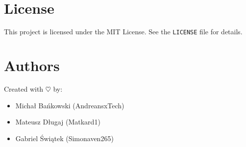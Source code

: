 \documentclass[11pt,a4paper]{article}
\begin{document}
\section{License}
This project is licensed under the MIT License. See the \texttt{LICENSE} file for details.

\section{Authors}
Created with \textcolor{staszicblue}{$\heartsuit$} by:
\begin{itemize}[leftmargin=*]
    \item Michał Bańkowski (AndreansxTech)
    \item Mateusz Długaj (Matkard1)
    \item Gabriel Świątek (Simonaven265)
\end{itemize}
\end{document}
